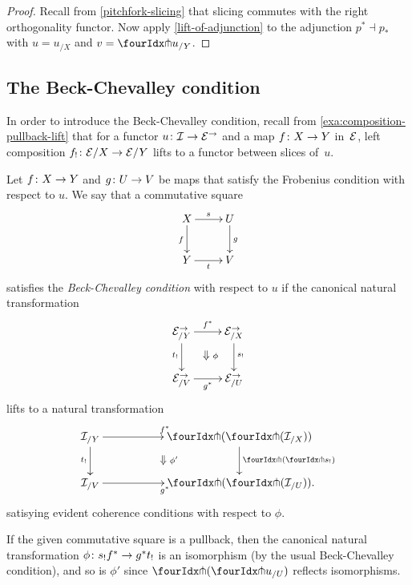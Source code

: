 \documentclass[reqno,10pt,a4paper,oneside,draft]{amsart}
\begin{document}
\begin{proof}
Recall from \cref{pitchfork-slicing} that slicing commutes with the right orthogonality functor.
Now apply \cref{lift-of-adjunction} to the adjunction $p^* \dashv p_*$ with $u = u_{/X}$ and $v = {\liftr{u}}_{/Y}$.
\end{proof}

\subsection*{The Beck-Chevalley condition}

In order to introduce the Beck-Chevalley condition, recall from \cref{exa:composition-pullback-lift} that for a functor $u \colon \mathcal{I} \to \mathcal{E}^\to$ and a map $f \colon X \to Y$ in~$\mathcal{E}$, left composition $f_! \colon \mathcal{E}/X \to \mathcal{E}/Y$ lifts to a functor between slices of~$u$.

\begin{definition} \label{def:beck-chevalley}
Let $f \colon X \to Y$ and $g \colon U \to V$ be maps that satisfy the Frobenius condition with respect to $u$.
We say that a commutative square
\[
\xymatrix{
  X
  \ar[d]_{f}
  \ar[r]^{s}
&
  U
  \ar[d]^{g}
\\
  Y
  \ar[r]_{t}
&
  V
}
\]
satisfies the \emph{Beck-Chevalley condition} with respect to $u$ if the canonical natural transformation
\[
\xymatrix{
  \catE^\to_{/Y}
   \ar[d]_{t_!}
  \ar[r]^{f^*}
  \ar@{}[dr]|{\textstyle\Downarrow \rlap{$\labelstyle\phi$}}
&
  \catE^\to_{/X}
  \ar[d]^{s_!}
\\
  \catE^\to_{/V}
  \ar[r]_{g^*}
&
  \catE^\to_{/U}
}
\]
lifts to a natural transformation
\[
\xymatrix@C+3em{
  \cal{I}_{/Y}
  \ar[r]^{f^*}
  \ar[d]_{t_!}
  \ar@{}[dr]|{\textstyle\Downarrow \rlap{$\labelstyle\phi'$}}
&
  {\liftl{(\liftr{(\cal{I}_{/X})})}}
  \ar[d]^{\liftl{(\liftr{s_!})}}
\\
  \cal{I}_{/V}
  \ar[r]_{g^*}
&
  {\liftl{(\liftr{(\cal{I}_{/U})})}}
\rlap{.}}
\]
satisying evident coherence conditions with respect to $\phi$.
\end{definition}

\begin{remark} \label{beck-chevalley-iso}
If the given commutative square is a pullback, then the canonical natural transformation $\phi \colon s_! f^* \to g^* t_!$ is an isomorphism (by the usual Beck-Chevalley condition), and so is $\phi'$ since $\liftl{(\liftr{u_{/U}})}$ reflects isomorphisms.
\end{remark}
\end{document}
